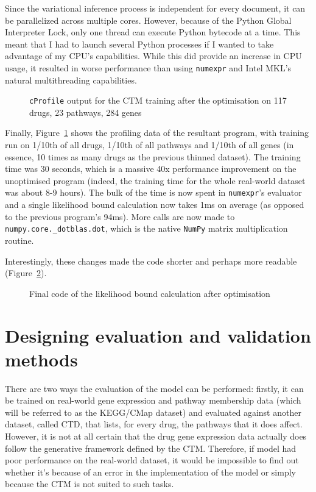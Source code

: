 \documentclass[12pt,a4paper,twoside,openright]{report}
\begin{document}
Since the variational inference process is independent for every document, it can be parallelized across multiple cores. However, because of the Python Global Interpreter Lock, only one thread can execute Python bytecode at a time. This meant that I had to launch several Python processes if I wanted to take advantage of my CPU's capabilities. While this did provide an increase in CPU usage, it resulted in worse performance than using \texttt{numexpr} and Intel MKL's natural multithreading capabilities.

\begin{figure}
\caption{\texttt{cProfile} output for the CTM training after the optimisation on 117 drugs, 23 pathways, 284 genes}
\label{fig:ctm-profile-after}
\end{figure}

Finally, Figure~\ref{fig:ctm-profile-after} shows the profiling data of the resultant program, with training run on 1/10th of all drugs, 1/10th of all pathways and 1/10th of all genes (in essence, 10 times as many drugs as the previous thinned dataset). The training time was 30 seconds, which is a massive 40x performance improvement on the unoptimised program (indeed, the training time for the whole real-world dataset was about 8-9 hours). The bulk of the time is now spent in \texttt{numexpr}'s evaluator and a single likelihood bound calculation now takes 1ms on average (as opposed to the previous program's 94ms). More calls are now made to \texttt{numpy.core.\_dotblas.dot}, which is the native \texttt{NumPy} matrix multiplication routine.

Interestingly, these changes made the code shorter and perhaps more readable (Figure~\ref{fig:code-after-optimisation}).

\begin{figure}
\caption{Final code of the likelihood bound calculation after optimisation}
\label{fig:code-after-optimisation}
\end{figure}

\section{Designing evaluation and validation methods}

There are two ways the evaluation of the model can be performed: firstly, it can be trained on real-world gene expression and pathway membership data (which will be referred to as the KEGG/CMap dataset) and evaluated against another dataset, called CTD, that lists, for every drug, the pathways that it does affect. However, it is not at all certain that the drug gene expression data actually does follow the generative framework defined by the CTM. Therefore, if model had poor performance on the real-world dataset, it would be impossible to find out whether it's because of an error in the implementation of the model or simply because the CTM is not suited to such tasks.
\end{document}
